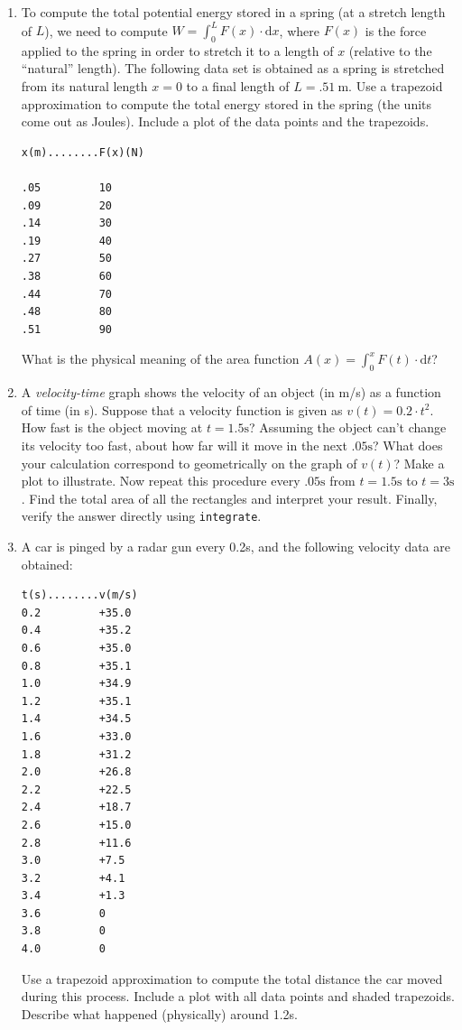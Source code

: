 \documentclass[10.5pt,twoside]{report}
\theoremstyle{definition}
\begin{document}
\begin{enumerate}
\item  To compute the total potential energy stored in a spring (at a stretch length of $L$), we need to compute $W=\displaystyle \int_{0}^{L} F(x)\cdot \mathrm{d}x$, where $F(x)$ is the force applied to the spring in order to stretch it to a length of $x$ (relative to the ``natural'' length).  The following data set is obtained as a spring is stretched from its natural length $x=0$ to a final length of $L=.51 \ \mathrm{m}$.  Use a trapezoid approximation to compute the total energy stored in the spring (the units come out as Joules).  Include a plot of the data points and the trapezoids.

\begin{verbatim}
x(m)........F(x)(N)

.05         10
.09	        20
.14         30
.19         40
.27         50
.38         60
.44         70
.48	        80
.51         90
\end{verbatim}

What is the physical meaning of the area function $A(x)=\displaystyle \int_{0}^{x} F(t) \cdot \mathrm{d}t$?

\item A \textit{velocity-time} graph shows the velocity of an object (in m/s) as a function of time (in s).  Suppose that a velocity function is given as $v(t)=0.2 \cdot t^2$.  How fast is the object moving at $t=1.5 \mathrm{s}$?  Assuming the object can't change its velocity too fast, about how far will it move in the next $.05 \mathrm{s}$?  What does your calculation correspond to geometrically on the graph of $v(t)$?  Make a plot to illustrate.  Now repeat this procedure every $.05 \mathrm{s}$ from $t=1.5 \mathrm{s}$ to $t=3 \mathrm{s}$.  Find the total area of all the rectangles and interpret your result.  Finally, verify the answer directly using \verb|integrate|.



\item  A car is pinged by a radar gun every 0.2s, and the following velocity data are obtained:

\begin{verbatim}
t(s)........v(m/s)
0.2	        +35.0
0.4	        +35.2
0.6	        +35.0
0.8	        +35.1
1.0	        +34.9
1.2	        +35.1
1.4	        +34.5
1.6	        +33.0
1.8	        +31.2
2.0	        +26.8
2.2         +22.5
2.4	        +18.7
2.6	        +15.0
2.8	        +11.6
3.0	        +7.5
3.2	        +4.1
3.4	        +1.3
3.6	        0
3.8	        0
4.0	        0
\end{verbatim}

Use a trapezoid approximation to compute the total distance the car moved during this process.  Include a plot with all data points and shaded trapezoids.  Describe what happened (physically) around 1.2s.


\end{enumerate}
\end{document}
